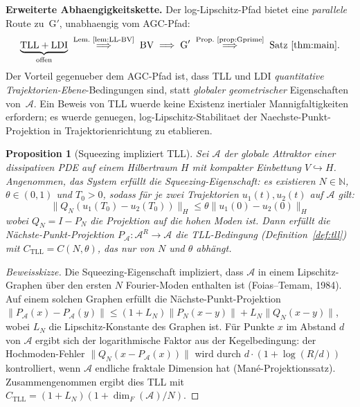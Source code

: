 \documentclass[12pt,a4paper]{article}
\theoremstyle{definition}
\theoremstyle{plain}
\newtheorem{proposition}[definition]{Proposition}
\theoremstyle{remark}
\begin{document}
\medskip\noindent
\textbf{Erweiterte Abhaengigkeitskette.}\;
Der log-Lipschitz-Pfad bietet eine \emph{parallele} Route zu~G$'$,
unabhaengig vom AGC-Pfad:
\[
  \underbrace{\textup{TLL} + \textup{LDI}}_{\text{offen}}
  \;\overset{\text{Lem.~\ref{lem:LL-BV}}}{\Longrightarrow}\;
  \textup{BV}
  \;\Longrightarrow\;
  \textup{G}'
  \;\overset{\text{Prop.~\ref{prop:Gprime}}}{\Longrightarrow}\;
  \textup{Satz~\ref{thm:main}}.
\]
Der Vorteil gegenueber dem AGC-Pfad ist, dass TLL und LDI
\emph{quantitative Trajektorien-Ebene}-Bedingungen sind, statt
\emph{globaler geometrischer} Eigenschaften von~$\mathcal{A}$.
Ein Beweis von TLL wuerde keine Existenz inertialer Mannigfaltigkeiten erfordern;
es wuerde genuegen, log-Lipschitz-Stabilitaet der Naechste-Punkt-Projektion
in Trajektorienrichtung zu etablieren.

\begin{proposition}[Squeezing impliziert TLL]\label{prop:squeezing-tll}
Sei $\mathcal{A}$ der globale Attraktor einer dissipativen PDE auf einem Hilbertraum $H$ mit kompakter Einbettung $V \hookrightarrow H$. Angenommen, das System erf\"ullt die \emph{Squeezing-Eigenschaft}: es existieren $N \in \mathbb{N}$, $\theta \in (0,1)$ und $T_0 > 0$, sodass f\"ur je zwei Trajektorien $u_1(t), u_2(t)$ auf $\mathcal{A}$ gilt:
\begin{equation}\label{eq:squeezing}
  \|Q_N(u_1(T_0) - u_2(T_0))\|_H \leq \theta \|u_1(0) - u_2(0)\|_H
\end{equation}
wobei $Q_N = I - P_N$ die Projektion auf die hohen Moden ist. Dann erf\"ullt die N\"achste-Punkt-Projektion $P_\mathcal{A}: \mathcal{A}^R \to \mathcal{A}$ die TLL-Bedingung (Definition~\ref{def:tll}) mit $C_{\mathrm{TLL}} = C(N, \theta)$, das nur von $N$ und $\theta$ abh\"angt.
\end{proposition}

\begin{proof}[Beweisskizze]
Die Squeezing-Eigenschaft impliziert, dass $\mathcal{A}$ in einem Lipschitz-Graphen \"uber den ersten $N$ Fourier-Moden enthalten ist (Foias--Temam, 1984). Auf einem solchen Graphen erf\"ullt die N\"achste-Punkt-Projektion
$\|P_\mathcal{A}(x) - P_\mathcal{A}(y)\| \leq (1 + L_N) \|P_N(x - y)\| + L_N \|Q_N(x - y)\|$,
wobei $L_N$ die Lipschitz-Konstante des Graphen ist. F\"ur Punkte $x$ im Abstand $d$ von $\mathcal{A}$ ergibt sich der logarithmische Faktor aus der Kegelbedingung: der Hochmoden-Fehler $\|Q_N(x - P_\mathcal{A}(x))\|$ wird durch $d \cdot (1 + \log(R/d))$ kontrolliert, wenn $\mathcal{A}$ endliche fraktale Dimension hat (Man\'e-Projektionssatz). Zusammengenommen ergibt dies TLL mit $C_{\mathrm{TLL}} = (1 + L_N)(1 + \dim_F(\mathcal{A})/N)$.
\end{proof}
\end{document}
